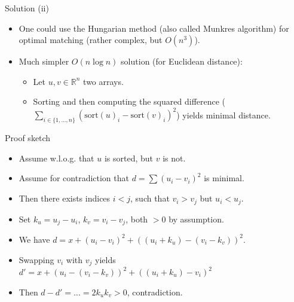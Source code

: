 \begin{slide}
	\begin{block}{Solution (ii)}
		\begin{itemize}
			\item One could use the Hungarian method (also called Munkres algorithm) for optimal matching (rather complex, but $O(n^3)$).
			\item Much simpler $O(n \log n)$ solution (for Euclidean distance):
			\begin{itemize}
				\item Let $u, v \in \mathbb{R}^n$ two arrays.
				\item Sorting and then computing the squared difference ($\sum_{i \in \{1, ..., n\}} (\mathrm{sort}(u)_i - \mathrm{sort}(v)_i)^2$) yields minimal distance.
			\end{itemize}
		\end{itemize}
	\end{block}
	\pause
	\begin{block}{Proof sketch}
		\tiny
		\begin{itemize}
			\item Assume w.l.o.g. that $u$ is sorted, but $v$ is not.
			\item Assume for contradiction that $d = \sum (u_i - v_i)^2$ is minimal.
			\item Then there exists indices $i < j$, such that $v_i > v_j$ but $u_i < u_j$.
			\item Set $k_u = u_j - u_i$, $k_v = v_i - v_j$, both $> 0$ by assumption.
			\item We have $d = x + (u_i - v_i)^2 + ((u_i + k_u) - (v_i - k_v))^2$.
			\item Swapping $v_i$ with $v_j$ yields $d' = x + (u_i - (v_i - k_v))^2 + ((u_i + k_u) - v_i)^2$
			\item Then $d - d' = \dots = 2 k_u k_v > 0$, contradiction.
		\end{itemize}
	\end{block}
\end{slide}

